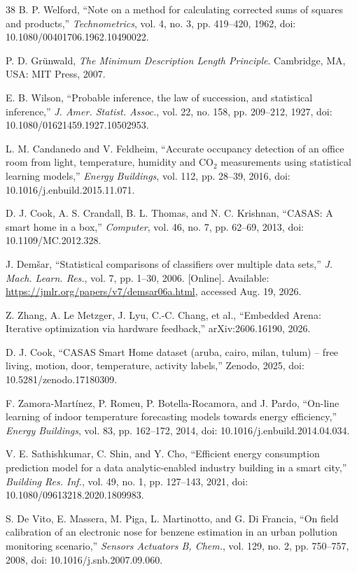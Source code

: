 \documentclass[review]{elsarticle}
\begin{document}
\begin{thebibliography}{38}
 B. P. Welford, ``Note on a method for calculating corrected sums
of squares and products,'' \emph{Technometrics}, vol. 4, no. 3, pp. 419--420,
1962, doi: 10.1080/00401706.1962.10490022.

 P. D. Gr\"unwald, \emph{The Minimum Description Length Principle}.
Cambridge, MA, USA: MIT Press, 2007.

 E. B. Wilson, ``Probable inference, the law of succession, and
statistical inference,'' \emph{J. Amer. Statist. Assoc.}, vol. 22, no. 158,
pp. 209--212, 1927, doi: 10.1080/01621459.1927.10502953.

 L. M. Candanedo and V. Feldheim, ``Accurate occupancy detection
of an office room from light, temperature, humidity and CO$_2$ measurements
using statistical learning models,'' \emph{Energy Buildings}, vol. 112, pp.
28--39, 2016, doi: 10.1016/j.enbuild.2015.11.071.

 D. J. Cook, A. S. Crandall, B. L. Thomas, and N. C. Krishnan,
``CASAS: A smart home in a box,'' \emph{Computer}, vol. 46, no. 7, pp.
62--69, 2013, doi: 10.1109/MC.2012.328.

 J. Dem\v{s}ar, ``Statistical comparisons of classifiers over
multiple data sets,'' \emph{J. Mach. Learn. Res.}, vol. 7, pp. 1--30, 2006.
[Online]. Available: \url{https://jmlr.org/papers/v7/demsar06a.html}, accessed
Aug. 19, 2026.

 Z. Zhang, A. Le Metzger, J. Lyu, C.-C. Chang, et al., ``Embedded
Arena: Iterative optimization via hardware feedback,'' arXiv:2606.16190,
2026.

 D. J. Cook, ``CASAS Smart Home dataset (aruba, cairo, milan,
tulum) -- free living, motion, door, temperature, activity labels,'' Zenodo,
2025, doi: 10.5281/zenodo.17180309.

 F. Zamora-Mart\'inez, P. Romeu, P. Botella-Rocamora, and J.
Pardo, ``On-line learning of indoor temperature forecasting models towards
energy efficiency,'' \emph{Energy Buildings}, vol. 83, pp. 162--172, 2014,
doi: 10.1016/j.enbuild.2014.04.034.

 V. E. Sathishkumar, C. Shin, and Y. Cho, ``Efficient energy
consumption prediction model for a data analytic-enabled industry building in
a smart city,'' \emph{Building Res. Inf.}, vol. 49, no. 1, pp. 127--143,
2021, doi: 10.1080/09613218.2020.1809983.

 S. De Vito, E. Massera, M. Piga, L. Martinotto, and G. Di
Francia, ``On field calibration of an electronic nose for benzene estimation
in an urban pollution monitoring scenario,'' \emph{Sensors Actuators B,
Chem.}, vol. 129, no. 2, pp. 750--757, 2008, doi: 10.1016/j.snb.2007.09.060.


\end{thebibliography}
\end{document}
